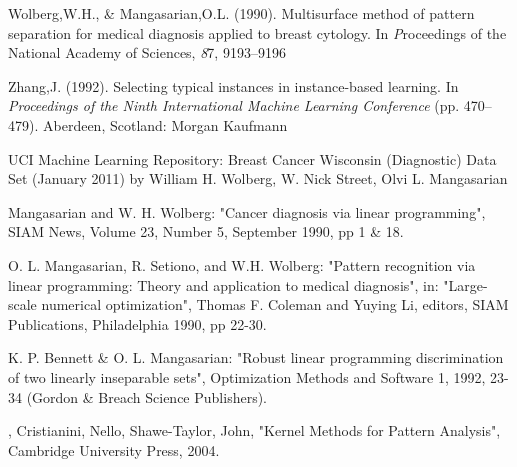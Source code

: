 \documentclass[conference]{IEEEtran}
\begin{document}
\begin{thebibliography}{1}

Wolberg,W.H., \& Mangasarian,O.L. (1990). Multisurface method of 
      pattern separation for medical diagnosis applied to breast cytology. In
      {\textit Proceedings of the National Academy of Sciences}, {\textit 87},
      9193--9196

Zhang,J. (1992). Selecting typical instances in instance-based
      learning.  In {\textit{ Proceedings of the Ninth International Machine
      Learning Conference}} (pp. 470--479).  Aberdeen, Scotland: Morgan
      Kaufmann

UCI Machine Learning Repository: Breast Cancer Wisconsin (Diagnostic) Data Set (January 2011) by William H. Wolberg, W. Nick Street, Olvi L. Mangasarian

Mangasarian and W. H. Wolberg: "Cancer diagnosis via linear 
      programming", SIAM News, Volume 23, Number 5, September 1990, pp 1 \& 18.

O. L. Mangasarian, R. Setiono, and W.H. Wolberg: "Pattern recognition 
      via linear programming: Theory and application to medical diagnosis", 
      in: "Large-scale numerical optimization", Thomas F. Coleman and Yuying
      Li, editors, SIAM Publications, Philadelphia 1990, pp 22-30.

K. P. Bennett \& O. L. Mangasarian: "Robust linear programming 
      discrimination of two linearly inseparable sets", Optimization Methods
      and Software 1, 1992, 23-34 (Gordon \& Breach Science Publishers).
      
,
Cristianini, Nello, Shawe-Taylor, John, "Kernel Methods for Pattern Analysis",
Cambridge University Press, 2004.


\end{thebibliography}
\end{document}
